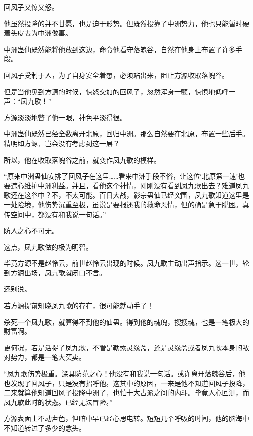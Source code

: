 
\begin{this_body}



回风子又惊又怒。

他虽然投降的并不甘愿，也是迫于形势。但既然投靠了中洲势力，他也只能暂时硬着头皮去为中洲做事。

中洲蛊仙既然能将他放到这边，命令他看守落魄谷，自然在他身上布置了许多手段。

回风子受制于人，为了自身安全着想，必须站出来，阻止方源收取落魄谷。

但是当他见到方源的时候，惊怒交加的回风子，忽然浑身一颤，惊惧地低呼一声：“凤九歌！”

方源淡淡地瞥了他一眼，神色平淡得很。

中洲蛊仙既然已经全数离开北原，回归中洲。那么自然要在北原，布置一些后手。精明如方源，岂会没有考虑到这一层？

所以，他在收取落魄谷之前，就变作凤九歌的模样。

“原来中洲蛊仙安排了回风子在这里……看来中洲手段不俗，让这位‘北原第一速’也要违心维护中洲利益。并且，看他这个神情，刚刚没有看到凤九歌出去？难道凤九歌还在这谷中？不，不太可能。百日大战，影宗蛊仙已经突围，凤九歌知道这里是一处险境，他伤势沉重至极，虽说是要报还我的救命恩情，但的确是急于脱困。真传空间中，都没有和我说一句话。”

防人之心不可无。

这点，凤九歌做的极为明智。

毕竟方源不是赵怜云，前世赵怜云出现的时候。凤九歌主动出声指示。这一世，轮到方源出场，凤九歌就闭口不言。

还别说。

若方源提前知晓凤九歌的存在，很可能就动手了！

杀死一个凤九歌，就算得不到他的仙蛊。得到他的魂魄，搜搜魂，也是一笔极大的财富啊。

更何况，若是活捉了凤九歌，不管是勒索灵缘斋，还是灵缘斋或者凤九歌本身的敌对势力，都是一笔大买卖。

“凤九歌伤势极重。深具防范之心！他没有和我说一句话。或许离开落魄谷后，他也发现了回风子，只是没有招呼他。这其中的原因，一来是他不知道回风子投降，二来就算他知道回风子投降中洲了，也怕十大古派之间的内斗。毕竟人心叵测，而凤九歌此时的状态。已经无法冒险。”

方源表面上不动声色，但暗中早已经心思电转。短短几个呼吸的时间，他的脑海中不知道转过了多少的念头。


\end{this_body}
